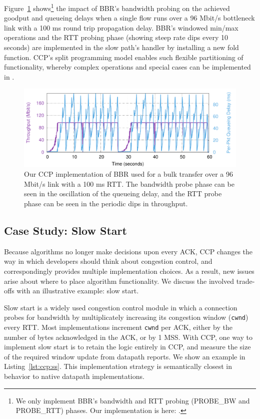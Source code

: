 Figure~\ref{fig:ccp:bbr} shows\footnote{We only implement BBR's bandwidth and RTT probing (PROBE\_BW and PROBE\_RTT) phases. Our implementation is here: .}
the impact of BBR's bandwidth probing on the
achieved goodput and queueing delays when a single flow runs over a 96 Mbit/s
bottleneck link with a 100 ms round trip propagation delay.
%
BBR's windowed min/max operations and the RTT probing phase (showing steep rate
dips every 10 seconds) are implemented in the slow path's 
handler by installing a new fold function.
%
CCP's split programming model enables such flexible partitioning of
functionality, whereby complex operations and special cases can be implemented
in \userspace.

\begin{figure}[t]
\centering
    \includegraphics[width=\columnwidth]{img/bbr}
    \caption{
    Our CCP implementation of BBR used for a bulk transfer over a 96 Mbit/s link with a 100 ms RTT. The bandwidth probe phase can be seen in the oscillation of the queueing delay, and the RTT probe phase can be seen in the periodic dips in throughput.
    }\label{fig:ccp:bbr}
\end{figure}

\subsection{Case Study: Slow Start}
\label{s:ccp:ss}

Because algorithms no longer make decisions upon every ACK, CCP changes the way in which developers should think about congestion control, and correspondingly provides multiple implementation choices. As a result, new issues arise about where to place algorithm functionality. We discuss the involved trade-offs with an illustrative example: slow start.

Slow start is a widely used congestion control module in which a connection probes for bandwidth by multiplicately increasing its congestion window (\texttt{cwnd}) every RTT. Most implementations increment \texttt{cwnd} per ACK, either by the number of bytes acknowledged in the ACK, or by 1 MSS. With CCP, one way to implement slow start is to retain the logic entirely in CCP, and measure the size of the required window update from datapath reports. We show an example in Listing~\ref{lst:ccp:ss}. This implementation strategy is semantically closest in behavior to native datapath implementations.

